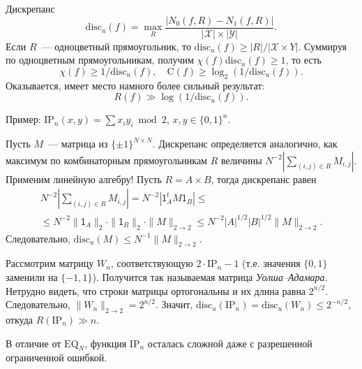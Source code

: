 \documentclass[handout]{beamer}
\renewcommand\le{\leqslant}
\renewcommand\ge{\geqslant}
\renewcommand\C{\mathrm{C}}
\begin{document}
\begin{frame}{Дискрепанс}
    $$
    \mathrm{disc}_u(f)=\max_R\frac{|N_0(f,R)-N_1(f,R)|}{|\mathcal
    X|\times|\mathcal Y|}.
    $$
    Если $R$~--- одноцветный прямоугольник, то $\mathrm{disc}_u(f)\ge
    |R|/|\mathcal X\times Y|$. Суммируя по одноцветным прямоугольникам, получим
    $\chi(f)\mathrm{disc}_u(f)\ge 1$, то есть
    $$
    \chi(f)\ge 1/\mathrm{disc}_u(f),\quad \C(f)\ge \log_2(1/\mathrm{disc}_u(f)).
    $$
    \pause\vspace{5pt}
    Оказывается, имеет место намного более сильный результат:
    $$
    R(f)\gg \log(1/\mathrm{disc}_u(f)).
    $$
\end{frame}

\begin{frame}
    Пример: $\mathrm{IP}_n(x,y)=\sum x_iy_i\bmod 2$, $x,y\in\{0,1\}^n$.
    \pause\vspace{5pt}

    Пусть $M$~--- матрица из $\{\pm1\}^{N\times N}$. Дискрепанс определяется
    аналогично, как максимум по комбинаторным прямоугольникам $R$ величины
    $N^{-2}|\sum_{(i,j)\in R} M_{i,j}|$.
    \pause
    Применим линейную алгебру! Пусть $R=A\times B$, тогда дискрепанс 
    равен
    \begin{multline*}
    N^{-2}|\sum_{(i,j)\in R} M_{i,j}| = N^{-2}|\mathsf{1}_A^t M \mathsf{1}_B|\le \\
    \le N^{-2}\|\mathsf{1}_A\|_2\cdot\|\mathsf{1}_B\|_2\cdot\|M\|_{2\to 2} \le
    N^{-2}|A|^{1/2}|B|^{1/2}\|M\|_{2\to 2}.
    \end{multline*}
    Следовательно, $\mathrm{disc}_u(M) \le N^{-1}\|M\|_{2\to 2}$.
    \pause\vspace{5pt}

    Рассмотрим матрицу $W_n$, соответствующую $2\cdot\mathrm{IP}_n-1$ (т.е.
    значения $\{0,1\}$ заменили на $\{-1,1\}$). Получится так называемая матрица
    \textit{Уолша--Адамара}. Нетрудно видеть, что строки
    матрицы ортогональны и их длина равна $2^{n/2}$. Следовательно, $\|W_n\|_{2\to
    2} = 2^{n/2}$. Значит, $\mathrm{disc}_u(\mathrm{IP}_n)=\mathrm{disc}_u(W_n)\le 2^{-n/2}$, откуда
    $R(\mathrm{IP}_n)\gg n$.

    В отличие от $\mathrm{EQ}_N$, функция $\mathrm{IP}_n$ осталась сложной даже
    с разрешенной ограниченной ошибкой.
\end{frame}
\end{document}
